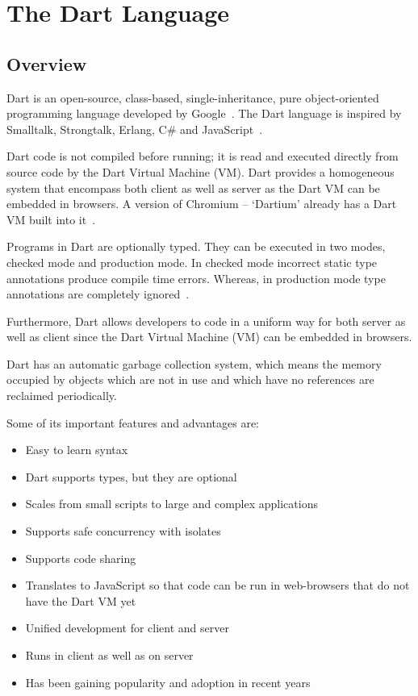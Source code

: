 \section{The Dart Language}
\label{sec:dart}
  \subsection{Overview}
  Dart is an open-source, class-based, single-inheritance, pure object-oriented programming language developed by Google~\cite{dartEcma}. The Dart language is inspired by Smalltalk, Strongtalk, Erlang, C\# and JavaScript~\cite{sethladd}.

  Dart code is not compiled before running; it is read and executed directly from source code by the Dart Virtual Machine (VM). Dart provides a homogeneous system that encompass both client as well as server as the Dart VM can be embedded in browsers. A version of Chromium – ‘Dartium’ already has a Dart VM built into it~\cite{sethladd}.

  Programs in Dart are optionally typed. They can be executed in two modes, checked mode and production mode. In checked mode incorrect static type annotations produce compile time errors. Whereas, in production mode type annotations are completely ignored~\cite{dartEcma}.

  Furthermore, Dart allows developers to code in a uniform way for both server as well as client since the Dart Virtual Machine (VM) can be embedded in browsers.

  Dart has an automatic garbage collection system, which means the memory occupied by objects which are not in use and which have no references are reclaimed periodically.

Some of its important features and advantages are:
  \begin{itemize}
    \item Easy to learn syntax
    \item Dart supports types, but they are optional
    \item Scales from small scripts to large and complex applications
    \item Supports safe concurrency with isolates
    \item Supports code sharing
    \item Translates to JavaScript so that code can be run in web-browsers that do not have the Dart VM yet
    \item Unified development for client and server
    \item Runs in client as well as on server
    \item Has been gaining popularity and adoption in recent years
\end{itemize}

